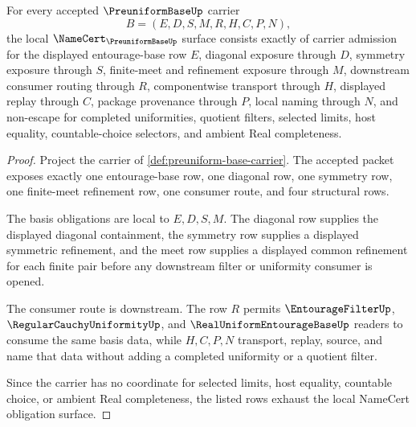 \begin{theorem}
\label{thm:preuniform-base-namecert-obligations}
For every accepted $\PreuniformBaseUp$ carrier
$$
B=(E,D,S,M,R,H,C,P,N),
$$
the local $\NameCert_{\PreuniformBaseUp}$ surface consists exactly of carrier admission for the displayed entourage-base row $E$, diagonal exposure through $D$, symmetry exposure through $S$, finite-meet and refinement exposure through $M$, downstream consumer routing through $R$, componentwise transport through $H$, displayed replay through $C$, package provenance through $P$, local naming through $N$, and non-escape for completed uniformities, quotient filters, selected limits, host equality, countable-choice selectors, and ambient Real completeness.
\end{theorem}
\begin{proof}
Project the carrier of \autoref{def:preuniform-base-carrier}. The accepted packet exposes exactly one entourage-base row, one diagonal row, one symmetry row, one finite-meet refinement row, one consumer route, and four structural rows.

The basis obligations are local to $E,D,S,M$. The diagonal row supplies the displayed diagonal containment, the symmetry row supplies a displayed symmetric refinement, and the meet row supplies a displayed common refinement for each finite pair before any downstream filter or uniformity consumer is opened.

The consumer route is downstream. The row $R$ permits $\EntourageFilterUp$, $\RegularCauchyUniformityUp$, and $\RealUniformEntourageBaseUp$ readers to consume the same basis data, while $H,C,P,N$ transport, replay, source, and name that data without adding a completed uniformity or a quotient filter.

Since the carrier has no coordinate for selected limits, host equality, countable choice, or ambient Real completeness, the listed rows exhaust the local NameCert obligation surface.
\end{proof}

